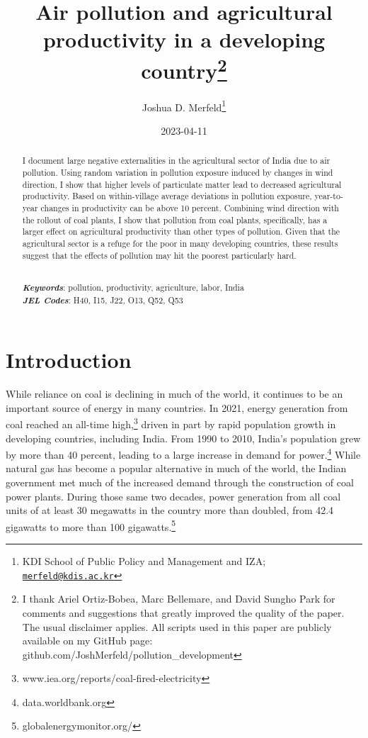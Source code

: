 \documentclass[
]{article}
\title{Air pollution and agricultural productivity in a developing country\footnote{I thank Ariel Ortiz-Bobea, Marc Bellemare, and David Sungho Park for comments and suggestions that greatly improved the quality of the paper. The usual disclaimer applies. All scripts used in this paper are publicly available on my GitHub page: github.com/JoshMerfeld/pollution\_development}}
\author{Joshua D. Merfeld\footnote{KDI School of Public Policy and Management and IZA; \href{mailto:merfeld@kdis.ac.kr}{\nolinkurl{merfeld@kdis.ac.kr}}}}
\date{2023-04-11}
\begin{document}
\maketitle
\begin{abstract}
\noindent I document large negative externalities in the agricultural sector of India due to air pollution. Using random variation in pollution exposure induced by changes in wind direction, I show that higher levels of particulate matter lead to decreased agricultural productivity. Based on within-village average deviations in pollution exposure, year-to-year changes in productivity can be above 10 percent. Combining wind direction with the rollout of coal plants, I show that pollution from coal plants, specifically, has a larger effect on agricultural productivity than other types of pollution. Given that the agricultural sector is a refuge for the poor in many developing countries, these results suggest that the effects of pollution may hit the poorest particularly hard.\\
\strut \\
\textbf{\textit{Keywords}}: pollution, productivity, agriculture, labor, India\\
\textbf{\textit{JEL Codes}}: H40, I15, J22, O13, Q52, Q53
\end{abstract}

\newpage
\doublespacing

\hypertarget{introduction}{%
\section{Introduction}\label{introduction}}

While reliance on coal is declining in much of the world, it continues to be an important source of energy in many countries. In 2021, energy generation from coal reached an all-time high,\footnote{www.iea.org/reports/coal-fired-electricity} driven in part by rapid population growth in developing countries, including India. From 1990 to 2010, India's population grew by more than 40 percent, leading to a large increase in demand for power.\footnote{data.worldbank.org} While natural gas has become a popular alternative in much of the world, the Indian government met much of the increased demand through the construction of coal power plants. During those same two decades, power generation from all coal units of at least 30 megawatts in the country more than doubled, from 42.4 gigawatts to more than 100 gigawatts.\footnote{globalenergymonitor.org/}
\end{document}
